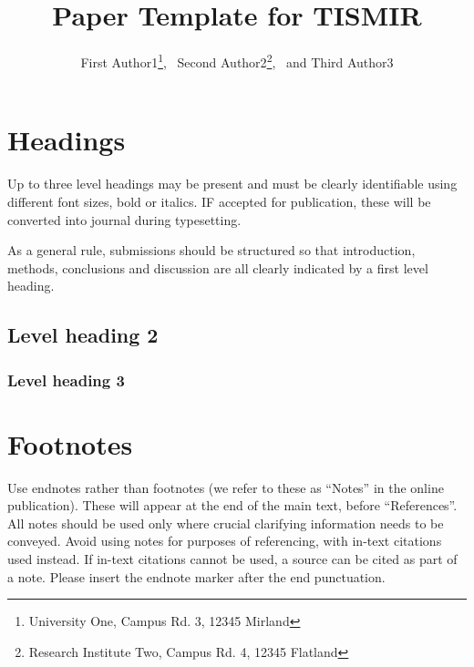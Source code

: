 \documentclass{article}
\title{Paper Template for TISMIR}
\author{%
First Author1\thanks{University One, Campus Rd. 3, 12345 Mirland},%
~Second Author2\thanks{Research Institute Two, Campus Rd. 4, 12345 Flatland},%
~and Third Author3\protect\footnotemark[1]}
\date{}
\begin{document}

\saythanks{}


\section{Headings}\label{sec:headings}

Up to three level headings may be present and must be clearly identifiable
using different font sizes, bold or italics. IF accepted for publication,
these will be converted into journal during typesetting.

As a general rule, submissions should be structured so that introduction,
methods, conclusions and discussion are all clearly indicated by a first level heading.

\subsection{Level heading 2}

\lipsum[66]

\subsubsection{Level heading 3}

\lipsum[75]

\section{Footnotes}\label{sec:footnotes}

Use endnotes rather than footnotes
(we refer to these as ``Notes'' in the online publication).
These will appear at the end of the main text, before ``References''.
All notes should be used only where crucial clarifying information
needs to be conveyed.
Avoid using notes for purposes of referencing, with in-text citations used
instead.
If in-text citations cannot be used, a source can be cited as part of a note.
Please insert the endnote marker after the end punctuation.
\end{document}
